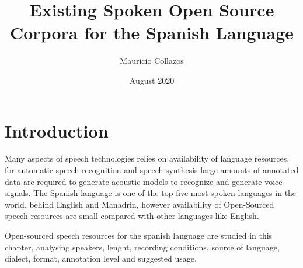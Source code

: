 \documentclass{article}
\title{Existing Spoken Open Source Corpora for the Spanish Language}
\author{Mauricio Collazos}
\date{August 2020}
\begin{document}
\maketitle

\section{Introduction}

Many aspects of speech technologies relies on availability of language resources, for automatic speech recognition and speech synthesis large amounts of annotated data are required to generate acoustic models to recognize and generate voice signals. The Spanish language is one of the top five most spoken languages in the world, behind English and Manadrin, however availability of Open-Sourced speech resources are small compared with other languages like English.

Open-sourced speech resources for the spanish language are studied in this chapter, analysing speakers, lenght, recording conditions, source of language, dialect, format, annotation level and suggested usage.
\end{document}

